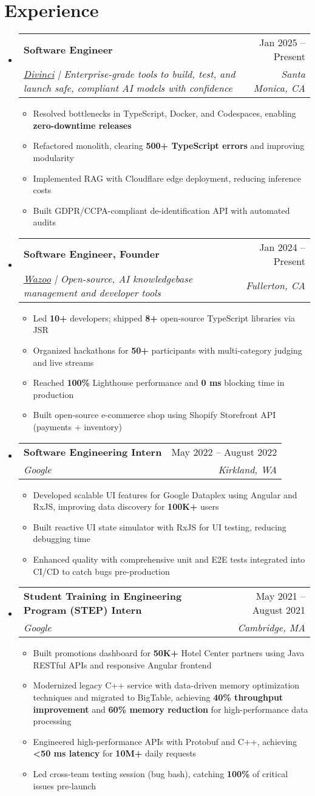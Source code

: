 \documentclass[letterpaper,11pt]{article}
\makeatletter
\newcommand{\resumeItem}[1]{
  \item\small{
    {#1 \vspace{-2pt}}
  }
}
\newcommand{\resumeSubheading}[4]{
  \vspace{-2pt}\item
    \begin{tabular*}{0.97\textwidth}[t]{l@{\extracolsep{\fill}}r}
      \textbf{#1} & #2 \\
      \textit{\small#3} & \textit{\small #4} \\
    \end{tabular*}\vspace{-2pt}
}
\newcommand{\resumeSubHeadingListStart}{\begin{itemize}[leftmargin=0.15in, label={}]}
\newcommand{\resumeSubHeadingListEnd}{\end{itemize}}
\newcommand{\resumeItemListStart}{\begin{itemize}}
\newcommand{\resumeItemListEnd}{\end{itemize}\vspace{-3pt}}
\makeatother
\begin{document}
\section{Experience}
\resumeSubHeadingListStart
  \resumeSubheading
    {Software Engineer}{Jan 2025 -- Present}
    {\href{https://divinci.ai/}{Divinci} | Enterprise-grade tools to build, test, and launch safe, compliant AI models with confidence}{Santa Monica, CA}
    \resumeItemListStart
      \resumeItem{Resolved bottlenecks in TypeScript, Docker, and Codespaces, enabling \textbf{zero-downtime releases}}
      \resumeItem{Refactored monolith, clearing \textbf{500+ TypeScript errors} and improving modularity}
      \resumeItem{Implemented RAG with Cloudflare edge deployment, reducing inference costs}
      \resumeItem{Built GDPR/CCPA-compliant de-identification API with automated audits}
    \resumeItemListEnd
  
  \resumeSubheading
    {Software Engineer, Founder}{Jan 2024 -- Present}
    {\href{https://wazoo.tech/}{Wazoo} | Open-source, AI knowledgebase management and developer tools}{Fullerton, CA}
    \resumeItemListStart
      \resumeItem{Led \textbf{10+} developers; shipped \textbf{8+} open-source TypeScript libraries via JSR}
      \resumeItem{Organized hackathons for \textbf{50+} participants with multi-category judging and live streams}
      \resumeItem{Reached \textbf{100\%} Lighthouse performance and \textbf{0 ms} blocking time in production}
      \resumeItem{Built open-source e-commerce shop using Shopify Storefront API (payments + inventory)}
    \resumeItemListEnd

  \resumeSubheading
    {Software Engineering Intern}{May 2022 -- August 2022}
    {Google}{Kirkland, WA}
    \resumeItemListStart
      \resumeItem{Developed scalable UI features for Google Dataplex using Angular and RxJS, improving data discovery for \textbf{100K+} users}
      \resumeItem{Built reactive UI state simulator with RxJS for UI testing, reducing debugging time}
      \resumeItem{Enhanced quality with comprehensive unit and E2E tests integrated into CI/CD to catch bugs pre-production}
    \resumeItemListEnd

  \resumeSubheading
    {Student Training in Engineering Program (STEP) Intern}{May 2021 -- August 2021}
    {Google}{Cambridge, MA}
    \resumeItemListStart
      \resumeItem{Built promotions dashboard for \textbf{50K+} Hotel Center partners using Java RESTful APIs and responsive Angular frontend}
      \resumeItem{Modernized legacy C++ service with data-driven memory optimization techniques and migrated to BigTable, achieving \textbf{40\% throughput improvement} and \textbf{60\% memory reduction} for high-performance data processing}
      \resumeItem{Engineered high-performance APIs with Protobuf and C++, achieving \textbf{<50 ms latency} for \textbf{10M+} daily requests}
      \resumeItem{Led cross-team testing session (bug bash), catching \textbf{100\%} of critical issues pre-launch}
    \resumeItemListEnd
\resumeSubHeadingListEnd
\end{document}
